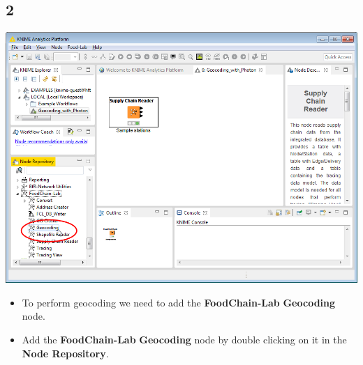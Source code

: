 \documentclass{beamer}
\begin{document}
\subsection{2}
\begin{frame}
	\begin{center}
  		\includegraphics[height=0.6\textheight]{2.png}
	\end{center}
	\begin{itemize}
        \item To perform geocoding we need to add the \textbf{FoodChain-Lab} \textbf{Geocoding} node.
		\item Add the \textbf{FoodChain-Lab} \textbf{Geocoding} node by double clicking on it in the \textbf{Node Repository}.
	\end{itemize}
\end{frame}
\end{document}
